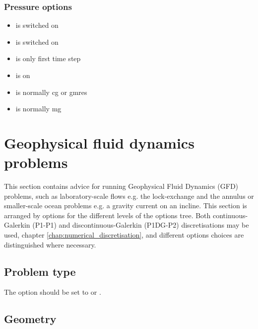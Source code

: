 \subsubsection{Pressure options}
\begin{itemize}
\item {} is switched on
\item {} is switched on
\item {} is only first time step
\item {} is  on
\item {} is normally cg or gmres
\item {} is normally mg
\end{itemize}


\section{Geophysical fluid dynamics problems}

This section contains advice for running Geophysical Fluid Dynamics (GFD) problems, such as laboratory-scale flows e.g. the lock-exchange and the annulus or smaller-scale ocean problems e.g. a gravity current on an incline. This section is arranged by options for the different levels of the options tree. Both continuous-Galerkin (P1-P1) and discontinuous-Galerkin (P1DG-P2) discretisations may be used, chapter \ref{chap:numerical_discretisation}, and different options choices are distinguished where necessary.

\subsection{Problem type}

The  option should be set to  or .

\subsection{Geometry}
\label{sec:GFD_config_geometry}

